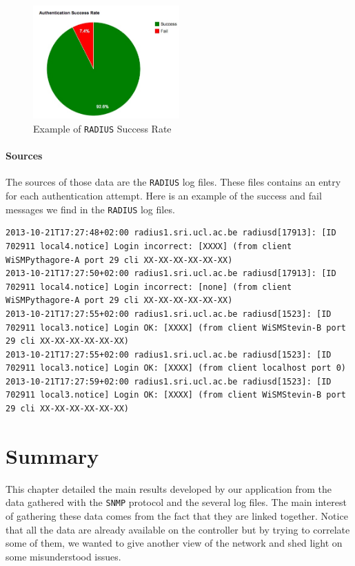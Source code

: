 \begin{figure}[H]
	\centering
   \includegraphics[width=0.5\textwidth]{Pictures/chapter5/radiusRate.jpg}
   \caption{Example of \texttt{RADIUS} Success Rate}
\end{figure} 

\paragraph*{Sources} The sources of those data are the \texttt{RADIUS} log files. These files contains an entry for each authentication attempt. Here is an example of the success and fail messages we find in the \texttt{RADIUS} log files.\\

\begin{lstlisting}[frame=single,breaklines=true,caption={\texttt{RADIUS} logs}]
2013-10-21T17:27:48+02:00 radius1.sri.ucl.ac.be radiusd[17913]: [ID 702911 local4.notice] Login incorrect: [XXXX] (from client WiSMPythagore-A port 29 cli XX-XX-XX-XX-XX-XX)
2013-10-21T17:27:50+02:00 radius1.sri.ucl.ac.be radiusd[17913]: [ID 702911 local4.notice] Login incorrect: [none] (from client WiSMPythagore-A port 29 cli XX-XX-XX-XX-XX-XX)
2013-10-21T17:27:55+02:00 radius1.sri.ucl.ac.be radiusd[1523]: [ID 702911 local3.notice] Login OK: [XXXX] (from client WiSMStevin-B port 29 cli XX-XX-XX-XX-XX-XX)
2013-10-21T17:27:55+02:00 radius1.sri.ucl.ac.be radiusd[1523]: [ID 702911 local3.notice] Login OK: [XXXX] (from client localhost port 0)
2013-10-21T17:27:59+02:00 radius1.sri.ucl.ac.be radiusd[1523]: [ID 702911 local3.notice] Login OK: [XXXX] (from client WiSMStevin-B port 29 cli XX-XX-XX-XX-XX-XX)
\end{lstlisting}

\section{Summary}
This chapter detailed the main results developed by our application from the data gathered with the \texttt{SNMP} protocol and the several log files. The main interest of gathering these data comes from the fact that they are linked together. Notice that all the data are already available on the controller but by trying to correlate some of them, we wanted to give another view of the network and shed light on some misunderstood issues. 

